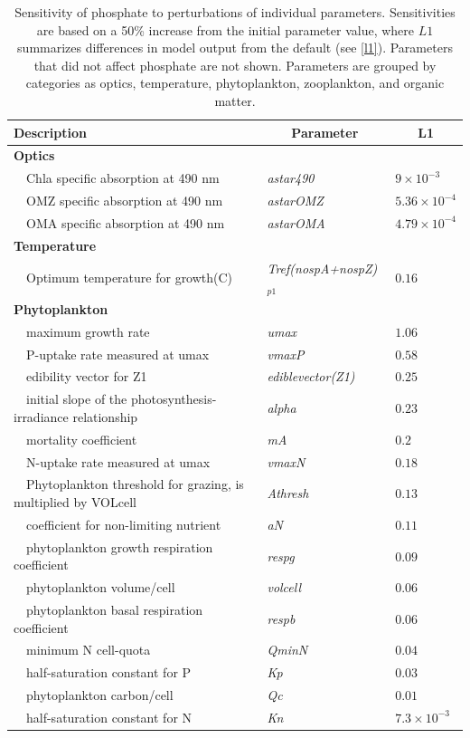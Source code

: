 \documentclass[letterpaper,12pt,oneside]{article}\usepackage[]{graphicx}\usepackage[]{color}
\begin{document}
\begin{table}[!tbp]
{\footnotesize
\caption{Sensitivity of phosphate to perturbations of individual parameters.  Sensitivities are based on a 50\% increase from the initial parameter value, where $L1$ summarizes differences in model output from the default (see \cref{l1}).  Parameters that did not affect phosphate are not shown.  Parameters are grouped by categories as optics, temperature, phytoplankton, zooplankton, and organic matter.\label{tab:po4sens}} 
\begin{center}
\begin{tabular}{lll}
\hline\hline
\multicolumn{1}{l}{Description}&\multicolumn{1}{c}{Parameter}&\multicolumn{1}{c}{L1}\tabularnewline
\hline
{\bfseries Optics}&&\tabularnewline
~~Chla specific absorption at 490 nm&\textit{astar490}&$9\times 10^{-3}$\tabularnewline
~~OMZ specific absorption at 490 nm&\textit{astarOMZ}&$5.36\times 10^{-4}$\tabularnewline
~~OMA specific absorption at 490 nm&\textit{astarOMA}&$4.79\times 10^{-4}$\tabularnewline
\hline
{\bfseries Temperature}&&\tabularnewline
~~Optimum temperature for growth(C)&\textit{Tref(nospA+nospZ)$_{p1}$}&$0.16$\tabularnewline
\hline
{\bfseries Phytoplankton}&&\tabularnewline
~~maximum growth rate&\textit{umax}&$1.06$\tabularnewline
~~P-uptake rate measured at umax&\textit{vmaxP}&$0.58$\tabularnewline
~~edibility vector for Z1&\textit{ediblevector(Z1)}&$0.25$\tabularnewline
~~initial slope of the photosynthesis-irradiance relationship&\textit{alpha}&$0.23$\tabularnewline
~~mortality coefficient&\textit{mA}&$0.2$\tabularnewline
~~N-uptake rate measured at umax&\textit{vmaxN}&$0.18$\tabularnewline
~~Phytoplankton threshold for grazing, is multiplied by VOLcell&\textit{Athresh}&$0.13$\tabularnewline
~~coefficient for non-limiting nutrient&\textit{aN}&$0.11$\tabularnewline
~~phytoplankton growth respiration coefficient&\textit{respg}&$0.09$\tabularnewline
~~phytoplankton volume/cell&\textit{volcell}&$0.06$\tabularnewline
~~phytoplankton basal respiration coefficient&\textit{respb}&$0.06$\tabularnewline
~~minimum N cell-quota&\textit{QminN}&$0.04$\tabularnewline
~~half-saturation constant for P&\textit{Kp}&$0.03$\tabularnewline
~~phytoplankton carbon/cell&\textit{Qc}&$0.01$\tabularnewline
~~half-saturation constant for N&\textit{Kn}&$7.3\times 10^{-3}$\tabularnewline

\end{tabular}
\end{center}}
\end{table}
\end{document}
